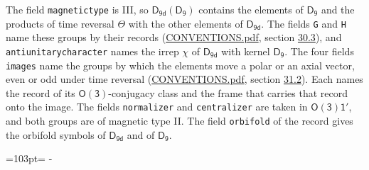 \documentclass[10pt,a4paper]{article}
\newcommand{\needspace}[1]{\par\penalty-100\begingroup\dimen0=#1\relax\dimen2=\pagegoal
  \advance\dimen2-\pagetotal\ifdim\dimen0>\dimen2\relax\ifdim\dimen2>0pt\vfil\break\fi\fi
  \endgroup}
\numberwithin{equation}{section}
\newcommand{\grp}[1]{\mathsf{#1}}
\begin{document}
The field \texttt{magnetictype} is III, so $\grp{D_{9d}}(\grp{D_{9}})$ contains the elements of $\grp{D_{9}}$ and the products of time reversal $\varTheta$ with the other elements of $\grp{D_{9d}}$. The fields \texttt{G} and \texttt{H} name these groups by their records (\href{../../CONVENTIONS.pdf}{CONVENTIONS.pdf}, section \href{../../CONVENTIONS.pdf\#conv.30.3}{30.3}), and \texttt{antiunitarycharacter} names the irrep $\chi$ of $\grp{D_{9d}}$ with kernel $\grp{D_{9}}$. The four fields \texttt{images} name the groups by which the elements move a polar or an axial vector, even or odd under time reversal (\href{../../CONVENTIONS.pdf}{CONVENTIONS.pdf}, section \href{../../CONVENTIONS.pdf\#conv.31.2}{31.2}). Each names the record of its $\grp{O(3)}$-conjugacy class and the frame that carries that record onto the image. The fields \texttt{normalizer} and \texttt{centralizer} are taken in $\grp{O(3)1'}$, and both groups are of magnetic type II. The field \texttt{orbifold} of the record gives the orbifold symbols of $\grp{D_{9d}}$ and of $\grp{D_{9}}$.
\needspace{103pt}
\end{document}
